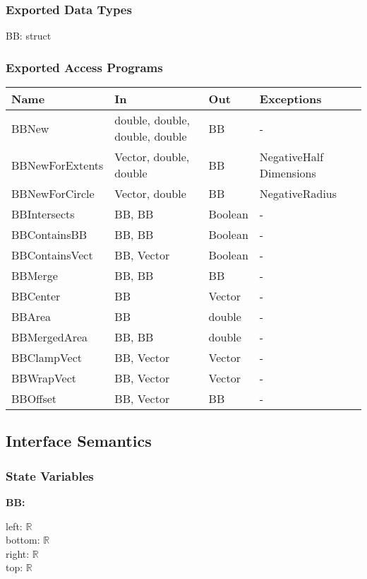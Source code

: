 \documentclass[12pt]{article}
\newcommand{\R}{$\mathbb{R}$}
\begin{document}
\subsubsection{Exported Data Types} \label{SecEDTBB}
	BB: struct

\subsubsection{Exported Access Programs} \label{SecEAPBB}
	\renewcommand*{\arraystretch}{1.2}
	\begin{longtable}{| y | x{3.5cm} | y | x{3.5cm} |}
	\hline \textbf{Name} & \textbf{In} & \textbf{Out} & \textbf{Exceptions} \\ \hline 
	 BBNew & double, double, double, double & BB & - \\ \hline
	 BBNewForExtents & Vector, double, double & BB & NegativeHalf Dimensions \\ \hline
	 BBNewForCircle & Vector, double & BB & NegativeRadius \\ \hline
	 BBIntersects & BB, BB & Boolean & - \\ \hline
	 BBContainsBB & BB, BB & Boolean & - \\ \hline
	 BBContainsVect & BB, Vector & Boolean & - \\ \hline
	 BBMerge & BB, BB & BB & - \\ \hline
	 BBCenter & BB & Vector & - \\ \hline
	 BBArea & BB & double & - \\ \hline
	 BBMergedArea & BB, BB & double & - \\ \hline
	 BBClampVect & BB, Vector & Vector & - \\ \hline
	 BBWrapVect & BB, Vector & Vector & - \\ \hline
	 BBOffset & BB, Vector & BB & - \\ \hline
\end{longtable}

\subsection{Interface Semantics}

\subsubsection{State Variables} \label{SecSVBB}
\textbf{BB:} 
\begin{multicols}{2}
	\noindent left: \R \\
	bottom: \R \\
	right: \R \\
	top: \R
\end{multicols}
\end{document}
